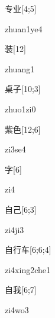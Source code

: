 \begin{verbete}[zhuan1ye4]{专业}[4;5]
\begin{pronuncia}{zhuan1ye4}
\end{pronuncia}
\end{verbete}

\begin{verbete}[zhuang1]{装}[12]
\begin{pronuncia}{zhuang1}
\end{pronuncia}
\end{verbete}

\begin{verbete}[zhuo1zi0]{桌子}[10;3]
\begin{pronuncia}{zhuo1zi0}
\end{pronuncia}
\end{verbete}

\begin{verbete}[zi3se4]{紫色}[12;6]
\begin{pronuncia}{zi3se4}
\end{pronuncia}
\end{verbete}

\begin{verbete}[zi4]{字}[6]
\begin{pronuncia}{zi4}
\end{pronuncia}
\end{verbete}

\begin{verbete}[zi4ji3]{自己}[6;3]
\begin{pronuncia}{zi4ji3}
\end{pronuncia}
\end{verbete}

\begin{verbete}{自行车}[6;6;4]
\begin{pronuncia}{zi4xing2che1}
\end{pronuncia}
\end{verbete}

\begin{verbete}[zi4wo3]{自我}[6;7]
\begin{pronuncia}{zi4wo3}
\end{pronuncia}
\end{verbete}

